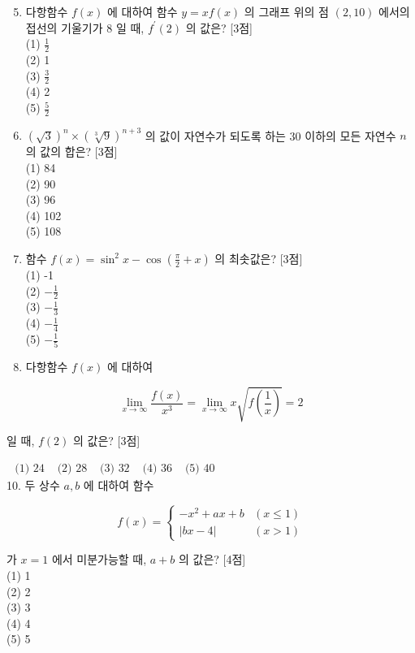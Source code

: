 \documentclass[10pt]{article}
\begin{document}
\begin{enumerate}
  \setcounter{enumi}{4}
  \item 다항함수 \(f(x)\) 에 대하여 함수 \(y=x f(x)\) 의 그래프 위의 점 \((2,10)\) 에서의 접선의 기울기가 8 일 때, \(f^{\prime}(2)\) 의 값은? [3점]\\
(1) \(\frac{1}{2}\)\\
(2) 1\\
(3) \(\frac{3}{2}\)\\
(4) 2\\
(5) \(\frac{5}{2}\)

  \item \((\sqrt{3})^{n} \times(\sqrt[3]{9})^{n+3}\) 의 값이 자연수가 되도록 하는 30 이하의 모든 자연수 \(n\) 의 값의 합은? [3점]\\
(1) 84\\
(2) 90\\
(3) 96\\
(4) 102\\
(5) 108

  \item 함수 \(f(x)=\sin ^{2} x-\cos \left(\frac{\pi}{2}+x\right)\) 의 최솟값은? [3점]\\
(1) -1\\
(2) \(-\frac{1}{2}\)\\
(3) \(-\frac{1}{3}\)\\
(4) \(-\frac{1}{4}\)\\
(5) \(-\frac{1}{5}\)

  \item 다항함수 \(f(x)\) 에 대하여

\end{enumerate}

\[
\lim _{x \rightarrow \infty} \frac{f(x)}{x^{3}}=\lim _{x \rightarrow \infty} x \sqrt{f\left(\frac{1}{x}\right)}=2
\]

일 때, \(f(2)\) 의 값은? [3점]

\(\begin{array}{lllll}\text { (1) } 24 & \text { (2) } 28 & \text { (3) } 32 & \text { (4) } 36 & \text { (5) } 40\end{array}\)\\
10. 두 상수 \(a, b\) 에 대하여 함수

\[
f(x)= \begin{cases}-x^{2}+a x+b & (x \leq 1) \\ |b x-4| & (x>1)\end{cases}
\]

가 \(x=1\) 에서 미분가능할 때, \(a+b\) 의 값은? [4점]\\
(1) 1\\
(2) 2\\
(3) 3\\
(4) 4\\
(5) 5
\end{document}
